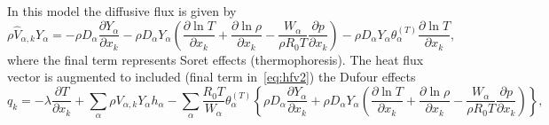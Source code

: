 \documentclass[notitlepage]{revtex4-1}
\begin{document}
In this model the diffusive flux is given by 
\begin{equation}\rho\hat{V}_{\alpha,k}Y_{\alpha}=-\rho{D}_{\alpha}\frac{\partial{Y}_{\alpha}}{\partial{x}_{k}}-\rho{D}_{\alpha}Y_{\alpha}\left(\frac{\partial\ln{T}}{\partial{x}_{k}}+\frac{\partial\ln\rho}{\partial{x}_{k}}-\frac{W_{\alpha}}{\rho{R}_{0}T}\frac{\partial{p}}{\partial{x}_{k}}\right)-\rho{D}_{\alpha}Y_{\alpha}\theta_{\alpha}^{\left(T\right)}\frac{\partial\ln{T}}{\partial{x}_{k}},\end{equation}
where the final term represents Soret effects (thermophoresis). The heat flux vector is augmented to included (final term in~\eqref{eq:hfv2}) the Dufour effects
\begin{equation}q_{k}=-\lambda\frac{\partial{T}}{\partial{x}_{k}}+\displaystyle\sum_{\alpha}\rho{V}_{\alpha,k}Y_{\alpha}h_{\alpha}-\displaystyle\sum_{\alpha}\frac{R_{0}T}{W_{\alpha}}\theta^{\left(T\right)}_{\alpha}\left\{\rho{D}_{\alpha}\frac{\partial{Y}_{\alpha}}{\partial{x}_{k}}+\rho{D}_{\alpha}Y_{\alpha}\left(\frac{\partial\ln{T}}{\partial{x}_{k}}+\frac{\partial\ln\rho}{\partial{x}_{k}}-\frac{W_{\alpha}}{\rho{R}_{0}T}\frac{\partial{p}}{\partial{x}_{k}}\right)\right\}\label{eq:hfv2},\end{equation}
\end{document}
